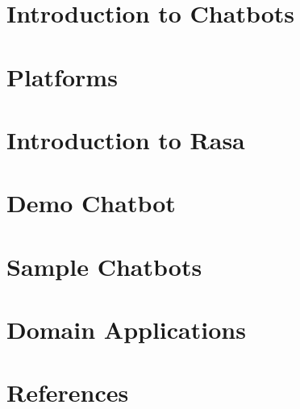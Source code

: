 \section[Intro]{Introduction to Chatbots}


\section[Platforms]{Platforms}


\section[Rasa]{Introduction to Rasa}




\section[Demo]{Demo Chatbot}


\section[Samples]{Sample Chatbots}



\section[Appl]{Domain Applications}


\section[Refs]{References}
